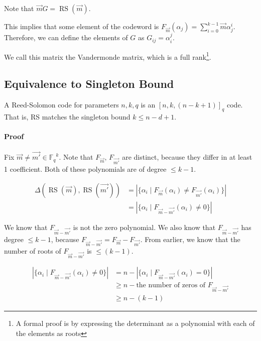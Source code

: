 \documentclass{idc_msc}
\newcommand{\Fq}[1][q]{{\mathbb{F}_{#1}}}
\DeclareMathOperator*{\RS}{RS}
\begin{document}
Note that \(\vec{m} G = \RS(\vec{m})\).

This implies that some element of the codeword is \(F_{\vec{m}}(\alpha_j) = \sum_{i=0}^{k-1} \vec{m} \alpha_j^i\).
Therefore, we can define the elements of \(G\) as \(G_{ij} = \alpha_i^j\).

We call this matrix the Vandermonde matrix, which is a full rank\footnote{A formal proof is by expressing the determinant as a polynomial with each of the elements as roots}.

\subsection{Equivalence to Singleton Bound}

A Reed-Solomon code for parameters \(n,k,q\) is an \([n,k,(n-k+1)]_q\) code.
That is, RS matches the singleton bound \(k \le n-d+1\).

\paragraph{Proof}

Fix \(\vec{m} \ne \vec{m'} \in \Fq^k\).
Note that \(F_{\vec{m}},\, F_{\vec{m'}}\) are distinct, because they differ in at least 1 coefficient.
Both of these polynomials are of degree \(\le k-1\).

\[
\begin{aligned}
  \Delta(\RS(\vec{m}), \RS(\vec{m'}))
  & = \left|\{ \alpha_i \mid F_{\vec{m}}(\alpha_i) \ne F_{\vec{m'}}(\alpha_i)\}\right| \\
  & = \left|\{ \alpha_i \mid F_{\vec{m} - \vec{m'}}(\alpha_i) \ne 0 \}\right|
\end{aligned}
\]

We know that \(F_{\vec{m} - \vec{m'}}\) is not the zero polynomial.
We also know that \(F_{\vec{m} - \vec{m'}}\) has degree \(\le k - 1\), because \(F_{\vec{m} - \vec{m'}} = F_{\vec{m}} - F_{\vec{m'}}\).
From earlier, we know that the number of roots of \(F_{\vec{m} - \vec{m'}}\) is \(\le (k-1)\).

\[
\begin{aligned}
\left|\{ \alpha_i \mid F_{\vec{m} - \vec{m'}}(\alpha_i) \ne 0 \}\right|
& = n - \left|\{ \alpha_i \mid F_{\vec{m} - \vec{m'}}(\alpha_i) = 0 \}\right| \\
& \ge n - \text{the number of zeros of \(F_{\vec{m} - \vec{m'}}\)} \\
& \ge n - (k - 1)
\end{aligned}
\]
\end{document}

